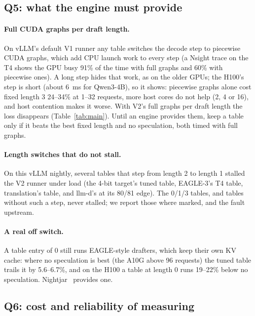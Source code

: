 \documentclass{article}
\begin{document}
\subsection{Q5: what the engine must provide}
\label{sec:eval-engine}

\paragraph{Full CUDA graphs per draft length.} On vLLM's default V1 runner any table switches the decode step to piecewise CUDA graphs, which add CPU launch work to every step (a Nsight trace on the T4 shows the GPU busy 91\% of the time with full graphs and 60\% with piecewise ones). A long step hides that work, as on the older GPUs; the H100's step is short (about 6~ms for Qwen3-4B), so it shows: piecewise graphs alone cost fixed length 3 24--34\% at 1--32 requests, more host cores do not help (2, 4 or 16), and host contention makes it worse. With V2's full graphs per draft length the loss disappears (Table~\ref{tab:main}). Until an engine provides them, keep a table only if it beats the best fixed length and no speculation, both timed with full graphs.

\paragraph{Length switches that do not stall.} On this vLLM nightly, several tables that step from length 2 to length 1 stalled the V2 runner under load (the 4-bit target's tuned table, EAGLE-3's T4 table, translation's table, and llm-d's at its 80/81 edge). The 0/1/3 tables, and tables without such a step, never stalled; we report those where marked, and the fault upstream.

\paragraph{A real off switch.} A table entry of 0 still runs EAGLE-style drafters, which keep their own KV cache: where no speculation is best (the A10G above 96 requests) the tuned table trails it by 5.6--6.7\%, and on the H100 a table at length 0 runs 19--22\% below no speculation. Nightjar~\cite{li2025nightjar} provides one.

\subsection{Q6: cost and reliability of measuring}
\label{sec:eval-cost}
\end{document}
